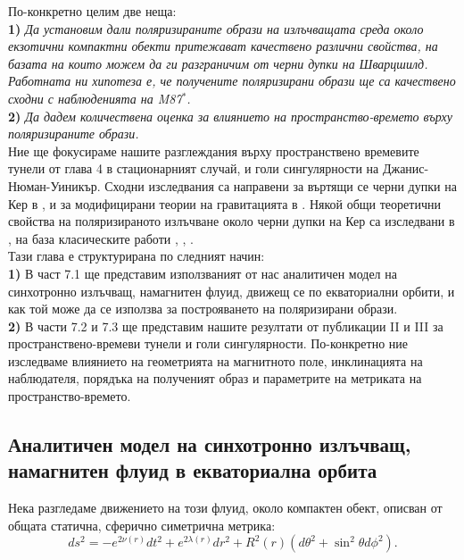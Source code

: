 По-конкретно целим две неща: \\

\textbf{1)} \emph{Да установим дали поляризираните образи на излъчващата среда около екзотични компактни обекти притежават качествено различни свойства, на базата на които можем да ги разграничим от черни дупки на Шварцшилд. Работната ни хипотеза е, че получените поляризирани образи ще са качествено сходни с наблюденията на M87$^*$.}\\

\textbf{2)} \emph{Да дадем количествена оценка за влиянието на пространство-времето върху поляризираните образи.}\\

Ние ще фокусираме нашите разглеждания върху пространствено времевите тунели от глава 4 в стационарният случай, и голи сингулярности на Джанис-Нюман-Уиникър. Сходни изследвания са направени за въртящи се черни дупки на Кер в \cite{Gelles2021}, и за модифицирани теории на гравитацията в \cite{Qin2021}. Някой общи теоретични свойства на поляризираното излъчване около черни дупки на Кер са изследвани в \cite{Himwich2020}, на база класическите работи \cite{Luminet1979}, \cite{Connors1980}, \cite{Chen1991}.\\

Тази глава е структурирана по следният начин: \\

\textbf{1)} В част 7.1 ще представим използваният от нас аналитичен модел на синхотронно излъчващ, намагнитен флуид, движещ се по екваториални орбити, и как той може да се използва за построяването на поляризирани образи.\\

\textbf{2)} В части 7.2 и 7.3 ще представим нашите резултати от публикации II и III за пространствено-времеви тунели и голи сингулярности. По-конкретно ние изследваме влиянието на геометрията на магнитното поле, инклинацията на наблюдателя, порядъка на полученият образ и параметрите на метриката на пространство-времето.\\

\subsection{Аналитичен модел на синхотронно излъчващ, намагнитен флуид в екваториална орбита}

Нека разгледаме движението на този флуид, около компактен обект, описван от общата статична, сферично симетрична метрика:
\begin{equation}
	ds^2 = - e^{2\nu(r)}dt^2 + e^{2\lambda(r)}dr^2 + R^2(r)\left(d\theta^2 + \sin^2\theta d\phi^2\right).
\end{equation}

